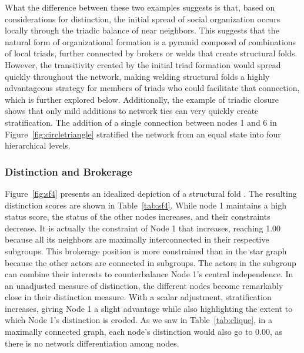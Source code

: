 \documentclass[12pt]{article}
\begin{document}
What the difference between these two examples suggests is that, based on considerations for distinction, the initial spread of social organization occurs locally through the triadic balance of near neighbors. This suggests that the natural form of organizational formation is a pyramid composed of combinations of local triads, further connected by brokers or welds that create structural folds. However, the transitivity created by the initial triad formation would spread quickly throughout the network, making welding structural folds a highly advantageous strategy for members of triads who could facilitate that connection, which is further explored below. Additionally, the example of triadic closure shows that only mild additions to network ties can very quickly create stratification. The addition of a single connection between nodes 1 and 6 in Figure~\ref{fig:circletriangle} stratified the network from an equal state into four hierarchical levels. 





\subsubsection{Distinction and Brokerage}

Figure~\ref{fig:sf4} presents an idealized depiction of a structural fold \citep{vedres2010structural}. The resulting distinction scores are shown in Table~\ref{tab:sf4}. While node 1 maintains a high status score, the status of the other nodes increases, and their constraints decrease. It is actually the constraint of Node 1 that increases, reaching 1.00 because all its neighbors are maximally interconnected in their respective subgroups. This brokerage position is more constrained than in the star graph because the other actors are connected in subgroups. The actors in the subgroup can combine their interests to counterbalance Node 1's central independence. In an unadjusted measure of distinction, the different nodes become remarkably close in their distinction measure. With a scalar adjustment, stratification increases, giving Node 1 a slight advantage while also highlighting the extent to which Node 1's distinction is eroded. As we saw in Table~\ref{tab:clique}, in a maximally connected graph, each node's distinction would also go to 0.00, as there is no network differentiation among nodes. 

% 
% 
% 
% 
\end{document}
